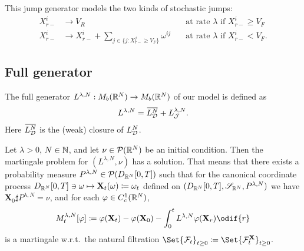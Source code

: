 This jump generator models the two kinds of stochastic jumps:
\begin{align}
  X_{r-}^i & \to V_R                                                           & \quad\text{at rate } \lambda \text{ if } X_{r-}^i \geq V_F \\
  X_{r-}^i & \to X_{r-}^i + \sum_{j \in \{j : X_{r-}^j \geq V_F\}} \omega^{ij} & \quad\text{at rate } \lambda \text{ if } X_{r-}^i < V_F.
\end{align}


\subsection{Full generator}

The full generator \(L^{\lambda, N} : M_b(\mathbb{R}^N) \to M_b(\mathbb{R}^N)\) of our model is defined as
\begin{equation}
  L^{\lambda, N} = \ol{L_{\cD}^{N}} + L_{\cJ}^{\lambda, N}.
\end{equation}
Here \(\ol{L_{\cD}^{N}}\) is the (weak) closure of \(L_{\mathcal{D}}^N\). %


\begin{theorem}\label{thm:mart-problem-sol}
  Let \(\lambda > 0\), \( N \in \mathbb{N} \), and let \(\nu \in \mathcal{P}(\mathbb{R}^N)\) be an initial condition.
  Then the martingale problem for \((L^{\lambda, N}, \nu)\) has a solution.%
  That means that there exists a probability measure \(P^{\lambda, N} \in \mathcal{P}(D_{\mathbb{R}^N}[0,T])\) such that for the canonical coordinate process \(D_{\mathbb{R}^N}[0,T] \ni \mathbf{\omega} \mapsto \mathbf{X}_t(\mathbf{\omega}) \coloneqq \mathbf{\omega}_t\) defined on \((D_{\mathbb{R}^N}[0,T], \mathscr{S}_{\mathbb{R}^N}, P^{\lambda, N})\) we have \( \bm{X}_0 \sharp P^{\lambda, N} = \nu \), and for each \(\varphi \in C_c^1(\mathbb{R}^N)\), %
  \begin{equation}\label{eq:M-def}
    M_t^{\lambda, N}[\varphi]
    \coloneqq \varphi(\bm{X}_t) - \varphi(\bm{X}_0) - \int_0^t L^{\lambda, N} \varphi(\bm{X}_r) \odif{r}
  \end{equation}
  is a martingale w.r.t.\ the natural filtration \(\Set{\cF_t}_{t\geq0} \coloneqq \Set{\cF_t^\bm{X}}_{t\geq0}\).    %
\end{theorem}

